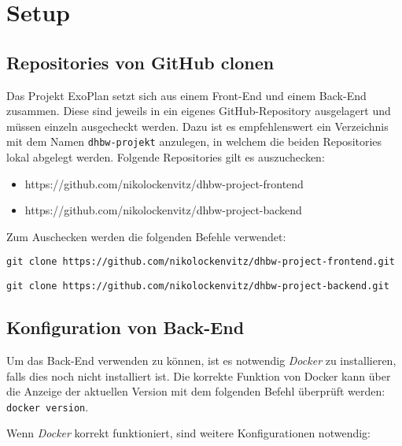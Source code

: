 \section{Setup}
\subsection{Repositories von GitHub clonen}

Das Projekt ExoPlan setzt sich aus einem Front-End und einem Back-End zusammen. 
Diese sind jeweils in ein eigenes GitHub-Repository ausgelagert und müssen einzeln ausgecheckt werden. 
Dazu ist es empfehlenswert ein Verzeichnis mit dem Namen \texttt{dhbw-projekt} anzulegen, in welchem die beiden Repositories lokal abgelegt werden. 
Folgende Repositories gilt es auszuchecken:
\begin{itemize}
	\item https://github.com/nikolockenvitz/dhbw-project-frontend
	\item https://github.com/nikolockenvitz/dhbw-project-backend
\end{itemize}

Zum Auschecken werden die folgenden Befehle verwendet:

\texttt{git clone https://github.com/nikolockenvitz/dhbw-project-frontend.git}

\texttt{git clone https://github.com/nikolockenvitz/dhbw-project-backend.git}

\subsection{Konfiguration von Back-End}

Um das Back-End verwenden zu können, ist es notwendig \textit{Docker} zu installieren, falls dies noch nicht installiert ist. 
Die korrekte Funktion von Docker kann über die Anzeige der aktuellen Version mit dem folgenden Befehl überprüft werden: \texttt{docker version}.

Wenn \textit{Docker} korrekt funktioniert, sind weitere Konfigurationen notwendig:


